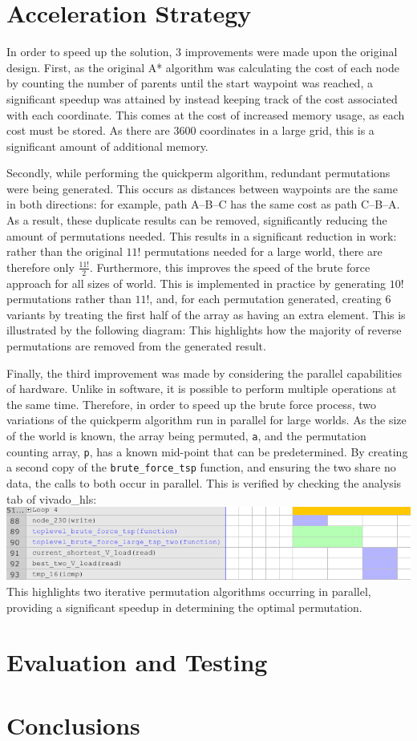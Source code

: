 \documentclass[a4paper, 11pt]{article}
\begin{document}
\section{Acceleration Strategy} %
In order to speed up the solution, 3 improvements were made upon the original design. 
First, as the original A* algorithm was calculating the cost of each node by 
counting the number of parents until the start waypoint was reached, a significant 
speedup was attained by instead keeping track of the cost associated with each 
coordinate. This comes at the cost of increased memory usage, as each cost must 
be stored. As there are 3600 coordinates in a large grid, this is a significant 
amount of additional memory. 
\par\bigskip\noindent
Secondly, while performing the quickperm algorithm, redundant permutations were being 
generated. This occurs as distances between waypoints are the same in both directions: 
for example, path A--B--C has the same cost as path C--B--A. As a result, these 
duplicate results can be removed, significantly reducing the amount of permutations 
needed. This results in a significant reduction in work: rather than the original 
$11!$ permutations needed for a large world, there are therefore only
$\frac{11!}{2}$. 
Furthermore, this improves the speed of the brute force approach for all sizes of 
world. This is implemented in practice by generating $10!$ permutations rather than
$11!$, and, for each permutation generated, creating $6$ variants by treating the 
first half of the array as having an extra element. This is illustrated by the
following diagram: 
This highlights how the majority of reverse permutations are removed from the
generated result. 
\par\bigskip\noindent
Finally, the third improvement was made by considering the parallel capabilities 
of hardware. Unlike in software, it is possible to perform multiple operations at 
the same time. Therefore, in order to speed up the brute force process, 
two variations of the quickperm algorithm run in parallel for large worlds. 
As the size of the world is known, the array being 
permuted, \texttt{a}, and the permutation counting array, \texttt{p}, has a known 
mid-point that can be predetermined. By creating a second copy of the 
\texttt{brute\_force\_tsp} function, and ensuring the two share no data, the calls 
to both occur in parallel. This is verified by checking the analysis tab of 
vivado\_hls:  \\
\includegraphics[width=\textwidth]{vivado_hls}
This highlights two iterative permutation algorithms occurring in parallel, providing 
a significant speedup in determining the optimal permutation. 

\section{Evaluation and Testing} %

\section{Conclusions} %


\end{document}
